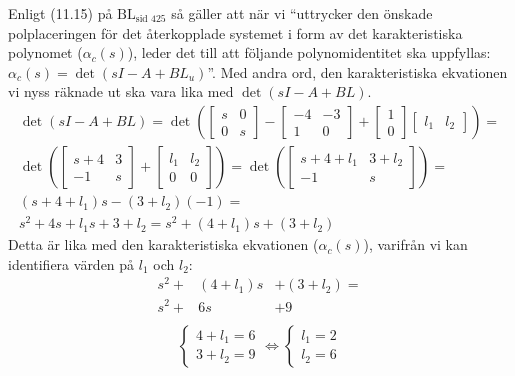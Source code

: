 \documentclass[a4paper]{article}
\newcommand{\bl}[1]{$\text{BL}_{\text{#1}}$}  %
\begin{document}
%
%
Enligt (11.15) på \bl{sid 425} så gäller att när vi ``uttrycker den önskade polplaceringen för det återkopplade systemet i form av det karakteristiska polynomet ($\alpha_c(s)$), leder det till att följande polynomidentitet ska uppfyllas: $\alpha_c(s) = \det(sI -A + BL_u)$''. Med andra ord, den karakteristiska ekvationen vi nyss räknade ut ska vara lika med $\det(sI -A + BL)$.
%
\begin{align*}
  \det(s I - A + BL) = \det\left(\begin{bmatrix}s & 0 \\ 0 & s \end{bmatrix} - \begin{bmatrix}-4 & -3 \\ 1 & 0\end{bmatrix} + \begin{bmatrix}1 \\ 0\end{bmatrix} \begin{bmatrix}l_1 & l_2\end{bmatrix} \right) = \\
  \det \left(\begin{bmatrix}s+4 & 3 \\ -1 & s \end{bmatrix} + \begin{bmatrix}l_1 & l_2 \\ 0 & 0\end{bmatrix} \right) = \det \left(\begin{bmatrix}s+4+l_1 & 3+l_2 \\ -1 & s\end{bmatrix} \right) = \\
  (s+4+l_1)s - (3+l_2)(-1) = \\
  s^2 +4s + l_1s + 3 + l_2 = s^2 + (4+l_1)s + (3 + l_2)
\end{align*}
%
Detta är lika med den karakteristiska ekvationen ($\alpha_c(s)$), varifrån vi kan identifiera värden på $l_1$ och $l_2$:
%
\begin{eqnarray*}
  s^2 + &(4+l_1)s &+ (3 + l_2) = \\
  s^2 + &6s &+ 9\\
\end{eqnarray*}
\vspace{-14mm}
\begin{align*}
  \left\{ \begin{array}{ll}
  4+l_1 = 6\\
  3+l_2 = 9
  \end{array} \right. \Longleftrightarrow
  \left\{ \begin{array}{ll}
  l_1 = 2\\
  l_2 = 6
  \end{array} \right.
\end{align*}
\end{document}
